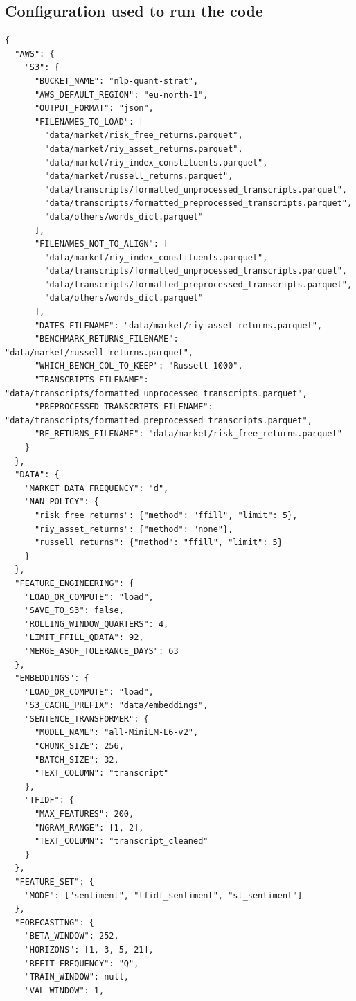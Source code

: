 \documentclass{article}
\begin{document}
\subsection{Configuration used to run the code}
\begin{lstlisting}
{
  "AWS": {
    "S3": {
      "BUCKET_NAME": "nlp-quant-strat",
      "AWS_DEFAULT_REGION": "eu-north-1",
      "OUTPUT_FORMAT": "json",
      "FILENAMES_TO_LOAD": [
        "data/market/risk_free_returns.parquet",
        "data/market/riy_asset_returns.parquet",
        "data/market/riy_index_constituents.parquet",
        "data/market/russell_returns.parquet",
        "data/transcripts/formatted_unprocessed_transcripts.parquet",
        "data/transcripts/formatted_preprocessed_transcripts.parquet",
        "data/others/words_dict.parquet"
      ],
      "FILENAMES_NOT_TO_ALIGN": [
        "data/market/riy_index_constituents.parquet",
        "data/transcripts/formatted_unprocessed_transcripts.parquet",
        "data/transcripts/formatted_preprocessed_transcripts.parquet",
        "data/others/words_dict.parquet"
      ],
      "DATES_FILENAME": "data/market/riy_asset_returns.parquet",
      "BENCHMARK_RETURNS_FILENAME": "data/market/russell_returns.parquet",
      "WHICH_BENCH_COL_TO_KEEP": "Russell 1000",
      "TRANSCRIPTS_FILENAME": "data/transcripts/formatted_unprocessed_transcripts.parquet",
      "PREPROCESSED_TRANSCRIPTS_FILENAME": "data/transcripts/formatted_preprocessed_transcripts.parquet",
      "RF_RETURNS_FILENAME": "data/market/risk_free_returns.parquet"
    }
  },
  "DATA": {
    "MARKET_DATA_FREQUENCY": "d",
    "NAN_POLICY": {
      "risk_free_returns": {"method": "ffill", "limit": 5},
      "riy_asset_returns": {"method": "none"},
      "russell_returns": {"method": "ffill", "limit": 5}
    }
  },
  "FEATURE_ENGINEERING": {
    "LOAD_OR_COMPUTE": "load",
    "SAVE_TO_S3": false,
    "ROLLING_WINDOW_QUARTERS": 4,
    "LIMIT_FFILL_QDATA": 92,
    "MERGE_ASOF_TOLERANCE_DAYS": 63
  },
  "EMBEDDINGS": {
    "LOAD_OR_COMPUTE": "load",
    "S3_CACHE_PREFIX": "data/embeddings",
    "SENTENCE_TRANSFORMER": {
      "MODEL_NAME": "all-MiniLM-L6-v2",
      "CHUNK_SIZE": 256,
      "BATCH_SIZE": 32,
      "TEXT_COLUMN": "transcript"
    },
    "TFIDF": {
      "MAX_FEATURES": 200,
      "NGRAM_RANGE": [1, 2],
      "TEXT_COLUMN": "transcript_cleaned"
    }
  },
  "FEATURE_SET": {
    "MODE": ["sentiment", "tfidf_sentiment", "st_sentiment"]
  },
  "FORECASTING": {
    "BETA_WINDOW": 252,
    "HORIZONS": [1, 3, 5, 21],
    "REFIT_FREQUENCY": "Q",
    "TRAIN_WINDOW": null,
    "VAL_WINDOW": 1,

\end{lstlisting}
\end{document}
